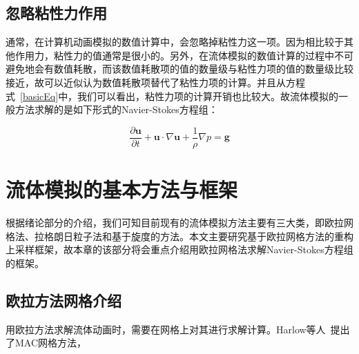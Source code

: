 \subsection{忽略粘性力作用}

通常，在计算机动画模拟的数值计算中，会忽略掉粘性力这一项。因为相比较于其他作用力，粘性力的值通常是很小的。另外，在流体模拟的数值计算的过程中不可避免地会有数值耗散，而该数值耗散项的值的数量级与粘性力项的值的数量级比较接近，故可以近似认为数值耗散项替代了粘性力项的计算。并且从方程式~\ref{basicEq}中，我们可以看出，粘性力项的计算开销也比较大。故流体模拟的一般方法求解的是如下形式的Navier-Stokes方程组：

\begin{equation}
\label{basicEqignoreVis}
 \frac{\partial \boldsymbol u}{\partial t} + {\boldsymbol u} \cdot \nabla {\boldsymbol u} + \frac{1}{\rho} \nabla p= {\boldsymbol g}
\end{equation}

\section{流体模拟的基本方法与框架}

根据绪论部分的介绍，我们可知目前现有的流体模拟方法主要有三大类，即欧拉网格法、拉格朗日粒子法和基于旋度的方法。本文主要研究基于欧拉网格方法的重构上采样框架，故本章的该部分将会重点介绍用欧拉网格法求解Navier-Stokes方程组的框架。

\subsection{欧拉方法网格介绍}

用欧拉方法求解流体动画时，需要在网格上对其进行求解计算。Harlow等人~\cite{harlow1965numerical}提出了MAC网格方法，


